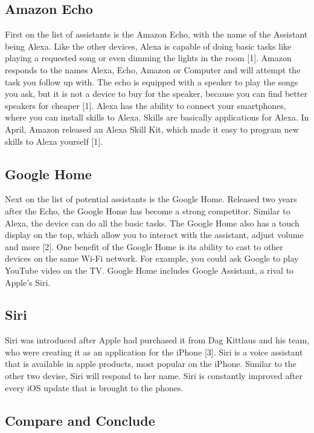 \documentclass[onecolumn, draftclsnofoot,10pt, compsoc]{IEEEtran}
\begin{document}
	\subsection{Amazon Echo}
	
		First on the list of assistants is the Amazon Echo, with the name of the Assistant being Alexa. Like the other devices, Alexa is capable of doing basic tasks like playing a requested song or even dimming 
		the lights in the room [1]. Amazon responds to the names Alexa, Echo, Amazon or Computer and will attempt the task you follow up with. The echo is equipped with a speaker to play the songs you ask, but it is
		not a device to buy for the speaker, because you can find better speakers for cheaper [1]. Alexa has the ability to connect your smartphones, where you can install skills to Alexa. Skills are basically applications
		for Alexa. In April, Amazon released an Alexa Skill Kit, which made it easy to program new skills to Alexa yourself [1]. 
		
	\subsection{Google Home}	
	
		Next on the list of potential assistants is the Google Home. Released two years after the Echo, the Google Home has become a strong competitor. Similar to Alexa, the device can do all the basic tasks. The Google Home 
		also has a touch display on the top, which allow you to interact with the assistant, adjust volume and more [2]. One benefit of the Google Home is its ability to cast to other devices on the same Wi-Fi network. For example, 
		you could ask Google to play YouTube video on the TV. Google Home includes Google Assistant, a rival to Apple’s Siri.
		
	\subsection{Siri}
	
		Siri was introduced after Apple had purchased it from Dag Kittlaus and his team, who were creating it as an application for the iPhone [3]. Siri is a voice assistant that is available in apple products, most popular on the iPhone.
		Similar to the other two devise, Siri will respond to her name. Siri is constantly improved after every iOS update that is brought to the phones.
		
	\subsection{Compare and Conclude}
	
\end{document}
